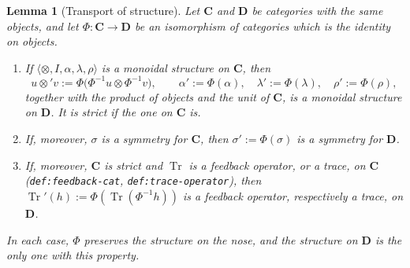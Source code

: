 \documentclass[11pt,a4paper]{article}
\theoremstyle{plain}
\newtheorem{lemma}[theorem]{Lemma}
\theoremstyle{definition}
\theoremstyle{remark}
\newcommand{\Cat}[1]{\mathbf{#1}}
\newcommand{\tup}[1]{\langle #1 \rangle}
\DeclareMathOperator{\Tr}{Tr}
\newcommand{\lbl}[1]{\nolinkurl{#1}}
\newcommand{\defeq}{\mathrel{:=}}
\begin{document}
\begin{lemma}[Transport of structure]
    \label{lem:transport}
    Let $\Cat{C}$ and $\Cat{D}$ be categories with the same objects, and let $\Phi \colon \Cat{C} \to \Cat{D}$ be an isomorphism of categories which is the identity on objects.
    \begin{enumerate}[label=(\alph*)]
        \item If $\tup{\otimes, I, \alpha, \lambda, \rho}$ is a monoidal structure on $\Cat{C}$, then
              \begin{equation}
                  \label{eq:transport}
                  u \otimes' v \defeq \Phi\bigl(\Phi^{-1}u \otimes \Phi^{-1}v\bigr),
                  \qquad
                  \alpha' \defeq \Phi(\alpha),
                  \quad
                  \lambda' \defeq \Phi(\lambda),
                  \quad
                  \rho' \defeq \Phi(\rho),
              \end{equation}
              together with the product of objects and the unit of $\Cat{C}$, is a monoidal structure on $\Cat{D}$.
              It is strict if the one on $\Cat{C}$ is.
        \item If, moreover, $\sigma$ is a symmetry for $\Cat{C}$, then $\sigma' \defeq \Phi(\sigma)$ is a symmetry for $\Cat{D}$.
        \item If, moreover, $\Cat{C}$ is strict and $\Tr$ is a feedback operator, or a trace, on $\Cat{C}$ (\lbl{def:feedback-cat}, \lbl{def:trace-operator}), then $\Tr'(h) \defeq \Phi(\Tr(\Phi^{-1}h))$ is a feedback operator, respectively a trace, on $\Cat{D}$.
    \end{enumerate}
    In each case, $\Phi$ preserves the structure on the nose, and the structure on $\Cat{D}$ is the only one with this property.
\end{lemma}
\end{document}
